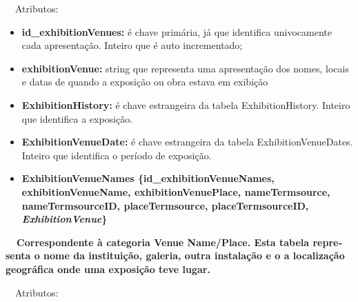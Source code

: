 \documentclass[letterpaper]{article}
\newcommand\textstyleStrongEmphasis[1]{\textbf{#1}}
\newcommand\liststyleLi{%
\renewcommand\labelitemi{{\textbullet}}
\renewcommand\labelitemii{[27A2?]}
\renewcommand\labelitemiii{{\textbullet}}
\renewcommand\labelitemiv{{\textbullet}}
}
\newcommand\liststyleLxiv{%
\renewcommand\labelitemi{[27A2?]}
\renewcommand\labelitemii{[27A2?]}
\renewcommand\labelitemiii{[27A2?]}
\renewcommand\labelitemiv{[27A2?]}
}
\begin{document}
\bigskip

{
\ \ Atributos:}

\liststyleLxiv
\begin{itemize}
\item {
\textbf{id\_exhibitionVenues: }\'e chave prim\'aria, j\'a que identifica
univocamente cada apresenta\c{c}\~ao. Inteiro que \'e auto
incrementado;}
\item {
\textbf{exhibitionVenue: }string que representa uma apresenta\c{c}\~ao
dos nomes, locais e datas de quando a exposi\c{c}\~ao ou obra estava em
exibi\c{c}\~ao}
\item {
\textbf{ExhibitionHistory:}\textit{ }\'e chave estrangeira da tabela
ExhibitionHistory. Inteiro que identifica a exposi\c{c}\~ao.}
\item {
\textbf{ExhibitionVenueDate: }\'e chave estrangeira da tabela
ExhibitionVenueDates. Inteiro que identifica o per\'iodo de
exposi\c{c}\~ao.}
\end{itemize}

\bigskip

\liststyleLi
\begin{itemize}
\item {\bfseries
ExhibitionVenueNames\textmd{
\{}\textmd{id\_exhibitionVenueNames}\textmd{, exhibitionVenueName,
exhibitionVenuePlace, nameTermsource, nameTermsourceID,
placeTermsource, placeTermsourceID,
}\textmd{\textit{ExhibitionVenue}}\textmd{\}}}
\end{itemize}
{\bfseries
\foreignlanguage{english}{\textmd{\ \ Correspondente \`a categoria
}}\foreignlanguage{english}{Venue}\textstyleStrongEmphasis{\foreignlanguage{english}{
Name/Place}}\foreignlanguage{english}{\textmd{. Esta
}}\textstyleStrongEmphasis{\foreignlanguage{english}{\textmd{tabela}}}\foreignlanguage{english}{\textmd{
representa o nome da institui\c{c}\~ao, galeria, outra instala\c{c}\~ao
e o a localiza\c{c}\~ao geogr\'afica onde uma exposi\c{c}\~ao teve
lugar.}}}


\bigskip

{
\ \ Atributos:}
\end{document}
